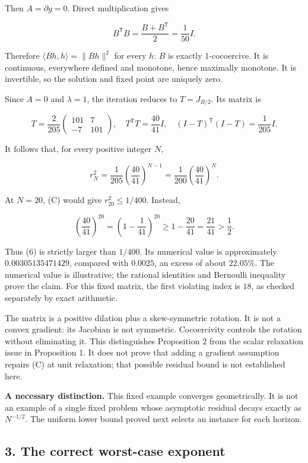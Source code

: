 \documentclass[
  british,
  11pt,
  a4paper,
]{article}
\let\oldsubsection\subsection
\renewcommand{\subsection}{\Needspace{5\baselineskip}\oldsubsection}
\begin{document}
Then \(A=\partial g=0\). Direct multiplication gives

\[B^\mathsf TB=\frac{B+B^\mathsf T}{2}=\frac1{50}I.\]

Therefore \(\langle Bh,h\rangle=\|Bh\|^2\) for every \(h\): \(B\) is
exactly 1-cocoercive. It is continuous, everywhere defined and monotone,
hence maximally monotone. It is invertible, so the solution and fixed
point are uniquely zero.

Since \(A=0\) and \(\lambda=1\), the iteration reduces to \(T=J_{B/2}\).
Its matrix is

\[
T=\frac2{205}
\begin{pmatrix}101&7\\-7&101\end{pmatrix},
\quad T^\mathsf TT=\frac{40}{41}I,
\quad (I-T)^\mathsf T(I-T)=\frac1{205}I.
\tag{5}
\]

It follows that, for every positive integer \(N\),

\[
r_N^2=\frac1{205}\left(\frac{40}{41}\right)^{N-1}
=\frac1{200}\left(\frac{40}{41}\right)^N.
\tag{6}
\]

At \(N=20\), (C) would give \(r_{20}^2\leq1/400\). Instead,

\[
\left(\frac{40}{41}\right)^{20}
=\left(1-\frac1{41}\right)^{20}
\geq1-\frac{20}{41}=\frac{21}{41}>\frac12.
\]

Thus (6) is strictly larger than \(1/400\). Its numerical value is
approximately \(0.00305135471429\), compared with \(0.0025\), an excess
of about \(22.05\%\). The numerical value is illustrative; the rational
identities and Bernoulli inequality prove the claim. For this fixed
matrix, the first violating index is \(18\), as checked separately by
exact arithmetic.

The matrix is a positive dilation plus a skew-symmetric rotation. It is
not a convex gradient: its Jacobian is not symmetric. Cocoercivity
controls the rotation without eliminating it. This distinguishes
Proposition 2 from the scalar relaxation issue in Proposition 1. It does
not prove that adding a gradient assumption repairs (C) at unit
relaxation; that possible residual bound is not established here.

\textbf{A necessary distinction.} This fixed example converges
geometrically. It is not an example of a single fixed problem whose
asymptotic residual decays exactly as \(N^{-1/2}\). The uniform lower
bound proved next selects an instance for each horizon.

\subsection{3. The correct worst-case
exponent}\label{the-correct-worst-case-exponent}
\end{document}
